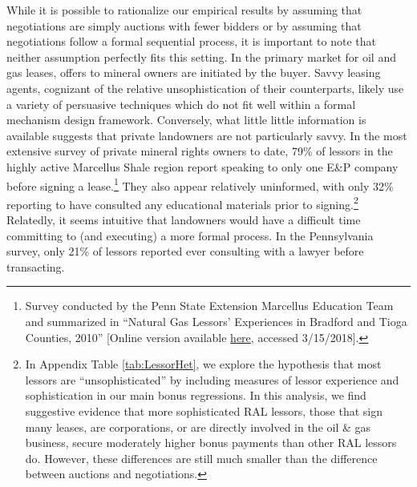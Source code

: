 \documentclass[12pt]{article}
\begin{document}
While it is possible to rationalize our empirical results by assuming that negotiations are simply auctions with fewer bidders or by assuming that negotiations follow a formal sequential process, it is important to note that neither assumption perfectly fits this setting. In the primary market for oil and gas leases, offers to mineral owners are initiated by the buyer. Savvy leasing agents, cognizant of the relative unsophistication of their counterparts, likely use a variety of persuasive techniques which do not fit well within a formal mechanism design framework. Conversely, what little little information is available suggests that private landowners are not particularly savvy.  In the most extensive survey of private mineral rights owners to date, 79\% of lessors in the highly active Marcellus Shale region report speaking to only one E\&P company before signing a lease.\footnote{Survey conducted by the Penn State Extension Marcellus Education Team and summarized in ``Natural Gas Lessors' Experiences in Bradford and Tioga Counties, 2010'' [Online version available \hyperlink{https://extension.psu.edu/natural-gas-lessors-experiences-in-bradford-and-tioga-counties-2010-1}{here}, accessed 3/15/2018].} They also appear relatively uninformed, with only 32\% reporting to have consulted any educational materials prior to signing.\footnote{In Appendix Table \ref{tab:LessorHet}, we explore the hypothesis that most lessors are ``unsophisticated'' by including measures of lessor experience and sophistication in our main bonus regressions.  In this analysis, we find suggestive evidence that more sophisticated RAL lessors, those that sign many leases, are corporations, or are directly involved in the oil \& gas business, secure moderately higher bonus payments than other RAL lessors do.  However, these differences are still much smaller than the difference between auctions and negotiations.} Relatedly, it seems intuitive that landowners would have a difficult time committing to (and executing) a more formal process. In the Pennsylvania survey, only 21\% of lessors reported ever consulting with a lawyer before transacting. 
\end{document}
